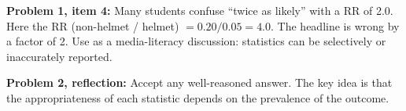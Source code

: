 \documentclass[10pt]{article}
\begin{document}
\begin{teachernote}
\textbf{Problem 1, item 4:} Many students confuse ``twice as likely'' with a RR of 2.0.
Here the RR (non-helmet / helmet) $= 0.20/0.05 = 4.0$. The headline is wrong by a factor of 2.
Use as a media-literacy discussion: statistics can be selectively or inaccurately reported.

\textbf{Problem 2, reflection:} Accept any well-reasoned answer. The key idea is that the
appropriateness of each statistic depends on the prevalence of the outcome.
\end{teachernote}
\end{document}
